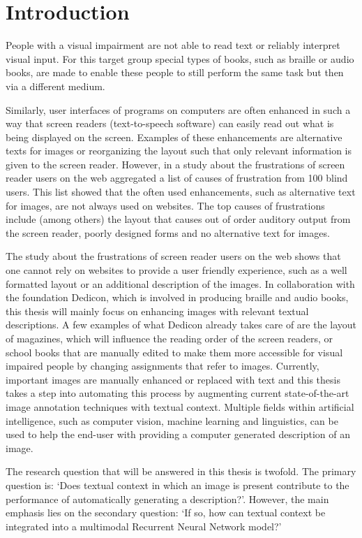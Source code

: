 \section{Introduction}
People with a visual impairment are not able to read text or reliably interpret visual input. For this target group special types of books, such as braille or audio books, are made to enable these people to still perform the same task but then via a different medium. 

Similarly, user interfaces of programs on computers are often enhanced in such a way that screen readers (text-to-speech software) can easily read out what is being displayed on the screen. Examples of these enhancements are alternative texts for images or reorganizing the layout such that only relevant information is given to the screen reader. However, in a study about the frustrations of screen reader users on the web \citeauthor{lazar2007frustrates} \cite{lazar2007frustrates} aggregated a list of causes of frustration from 100 blind users. This list showed that the often used enhancements, such as alternative text for images, are not always used on websites. The top causes of frustrations include (among others) the layout that causes out of order auditory output from the screen reader, poorly designed forms and no alternative text for images. 

The study about the frustrations of screen reader users on the web shows that one cannot rely on websites to provide a user friendly experience, such as a well formatted layout or an additional description of the images. In collaboration with the foundation Dedicon, which is involved in producing braille and audio books, this thesis will mainly focus on enhancing images with relevant textual descriptions. A few examples of what Dedicon already takes care of are the layout of magazines, which will influence the reading order of the screen readers, or school books that are manually edited to make them more accessible for visual impaired people by changing assignments that refer to images. Currently, important images are manually enhanced or replaced with text and this thesis takes a step into automating this process by augmenting current state-of-the-art image annotation techniques with textual context. Multiple fields within artificial intelligence, such as computer vision, machine learning and linguistics, can be used to help the end-user with providing a computer generated description of an image. 

The research question that will be answered in this thesis is twofold. The primary question is: `Does textual context in which an image is present contribute to the performance of automatically generating a description?'. However, the main emphasis lies on the secondary question: `If so, how can textual context be integrated into a multimodal Recurrent Neural Network model?'

